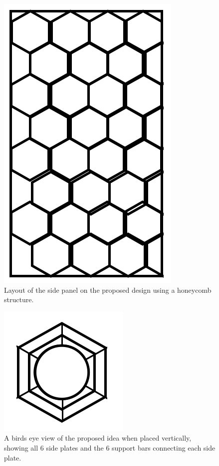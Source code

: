 \newpage
\begin{multicols}{2}
\begin{figure}[H]
\centering
\includegraphics[scale=0.5]{Media/ProductDesign/HexPlate.png}
\caption{Layout of the side panel on the proposed design using a honeycomb structure.}
\label{Hexangonal Plate}
\end{figure}

\begin{figure}[H]
\centering
\includegraphics[scale=1.0]{Media/ProductDesign/BirdsEye.png}
\caption{A birds eye view of the proposed idea when placed vertically, showing all 6 side plates and the 6 support bars connecting each side plate.}
\label{Birds eye image}
\end{figure}
\end{multicols}

